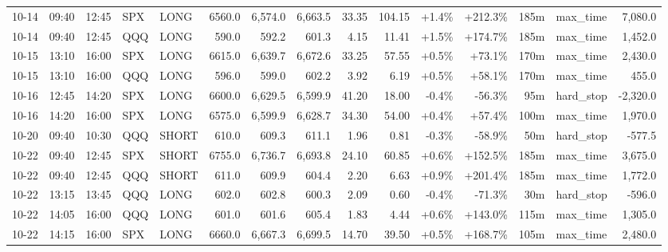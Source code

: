 \documentclass[11pt,a4paper,twoside]{article}
\begin{document}
\begin{landscape}
\begin{center}
\begin{longtable}{>{\color{txtmain}}l l l l l r r r r r r r r >{\color{txtmain}}l r}
10-14 & 09:40 & 12:45 & SPX & LONG & 6560.0 & 6,574.0 & 6,663.5 & 33.35 & 104.15 & \textcolor{wingreen}{+1.4\%} & \textcolor{wingreen}{+212.3\%} & 185m & max\_time & \textcolor{wingreen}{7,080.0} \\
10-14 & 09:40 & 12:45 & QQQ & LONG & 590.0 & 592.2 & 601.3 & 4.15 & 11.41 & \textcolor{wingreen}{+1.5\%} & \textcolor{wingreen}{+174.7\%} & 185m & max\_time & \textcolor{wingreen}{1,452.0} \\
10-15 & 13:10 & 16:00 & SPX & LONG & 6615.0 & 6,639.7 & 6,672.6 & 33.25 & 57.55 & \textcolor{wingreen}{+0.5\%} & \textcolor{wingreen}{+73.1\%} & 170m & max\_time & \textcolor{wingreen}{2,430.0} \\
10-15 & 13:10 & 16:00 & QQQ & LONG & 596.0 & 599.0 & 602.2 & 3.92 & 6.19 & \textcolor{wingreen}{+0.5\%} & \textcolor{wingreen}{+58.1\%} & 170m & max\_time & \textcolor{wingreen}{455.0} \\
10-16 & 12:45 & 14:20 & SPX & LONG & 6600.0 & 6,629.5 & 6,599.9 & 41.20 & 18.00 & \textcolor{lossred}{-0.4\%} & \textcolor{lossred}{-56.3\%} & 95m & hard\_stop & \textcolor{lossred}{-2,320.0} \\
10-16 & 14:20 & 16:00 & SPX & LONG & 6575.0 & 6,599.9 & 6,628.7 & 34.30 & 54.00 & \textcolor{wingreen}{+0.4\%} & \textcolor{wingreen}{+57.4\%} & 100m & max\_time & \textcolor{wingreen}{1,970.0} \\
10-20 & 09:40 & 10:30 & QQQ & SHORT & 610.0 & 609.3 & 611.1 & 1.96 & 0.81 & \textcolor{lossred}{-0.3\%} & \textcolor{lossred}{-58.9\%} & 50m & hard\_stop & \textcolor{lossred}{-577.5} \\
10-22 & 09:40 & 12:45 & SPX & SHORT & 6755.0 & 6,736.7 & 6,693.8 & 24.10 & 60.85 & \textcolor{wingreen}{+0.6\%} & \textcolor{wingreen}{+152.5\%} & 185m & max\_time & \textcolor{wingreen}{3,675.0} \\
10-22 & 09:40 & 12:45 & QQQ & SHORT & 611.0 & 609.9 & 604.4 & 2.20 & 6.63 & \textcolor{wingreen}{+0.9\%} & \textcolor{wingreen}{+201.4\%} & 185m & max\_time & \textcolor{wingreen}{1,772.0} \\
10-22 & 13:15 & 13:45 & QQQ & LONG & 602.0 & 602.8 & 600.3 & 2.09 & 0.60 & \textcolor{lossred}{-0.4\%} & \textcolor{lossred}{-71.3\%} & 30m & hard\_stop & \textcolor{lossred}{-596.0} \\
10-22 & 14:05 & 16:00 & QQQ & LONG & 601.0 & 601.6 & 605.4 & 1.83 & 4.44 & \textcolor{wingreen}{+0.6\%} & \textcolor{wingreen}{+143.0\%} & 115m & max\_time & \textcolor{wingreen}{1,305.0} \\
10-22 & 14:15 & 16:00 & SPX & LONG & 6660.0 & 6,667.3 & 6,699.5 & 14.70 & 39.50 & \textcolor{wingreen}{+0.5\%} & \textcolor{wingreen}{+168.7\%} & 105m & max\_time & \textcolor{wingreen}{2,480.0} \\

\end{longtable}
\end{center}
\end{landscape}
\end{document}
